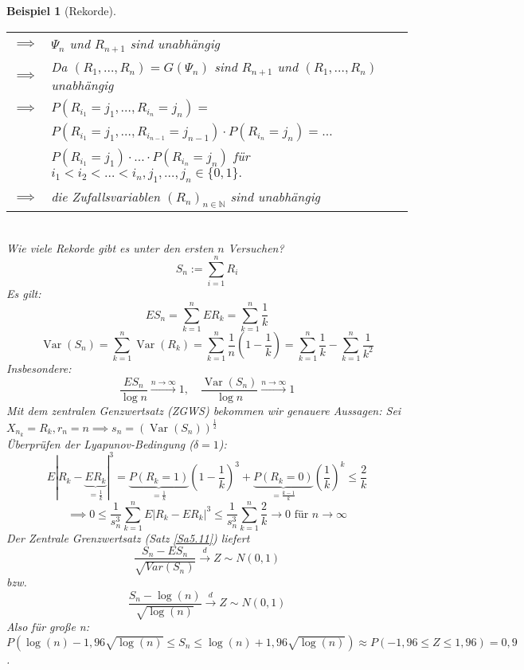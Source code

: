 \documentclass[a4paper,11pt]{book}
\newcommand{\N}{{\mathbb N}}
\DeclareMathOperator{\var}{Var}
\def\folgt{\ensuremath{\implies}}
\def\dto{\stackrel{d}{\rightarrow}}
\newtheorem{Bsp}{Beispiel}[chapter]
\theoremstyle{nonumberplain}
\begin{document}
\begin{Bsp}[Rekorde]
\begin{tabular}[b]{rp{}}
$\folgt$ & $\Psi_n$ und $R_{n+1}$ sind unabhängig\\
$\folgt$ & Da $(R_1, \ldots, R_n) = G(\Psi_n)$ sind $R_{n+1}$ und $(R_1,\ldots,R_n)$ unabhängig\\
$\folgt$& $P(R_{i_1}=j_1,\ldots,R_{i_n}=j_n) =$\\
&$P(R_{i_1}=j_1,\ldots,R_{i_{n-1}}=j_{n-1})\cdot P(R_{i_n}=j_n) = \ldots$\\
&$P(R_{i_1}=j_1)\cdot\ldots\cdot P(R_{i_n} = j_n)$ für $i_1<i_2<\ldots<i_n, j_1,\ldots,j_n\in\{0,1\}.$\\
$\folgt$ & die Zufallsvariablen $(R_n)_{n\in\N}$ sind unabhängig
\end{tabular}\\
Wie viele Rekorde gibt es unter den ersten $n$ Versuchen?
$$S_n:=\sum_{i=1}^n R_i$$
Es gilt:
$$ES_n = \sum_{k=1}^n ER_k = \sum_{k=1}^n \frac 1 k$$
$$\var(S_n) = \sum_{k=1}^n\var(R_k) = \sum_{k=1}^n\frac 1 n (1 - \frac 1 k ) = \sum_{k=1}^n\frac 1 k - \sum_{k=1}^n \frac 1 {k^2}$$
Insbesondere:
$$\frac{ES_n}{\log n}\stackrel{n\to\infty}{\to}1,\quad\frac{\var(S_n)}{\log n}\stackrel{n\to\infty}{\to}1$$
Mit dem zentralen Genzwertsatz (ZGWS) bekommen wir genauere Aussagen: Sei $X_{n_k} = R_k, r_n = n \folgt s_n = \left(\var(S_n)\right)^{\frac 1 2}$\\
Überprüfen der Lyapunov-Bedingung ($\delta = 1$):
$$E|R_k - \underbrace{ER_k}_{= \frac 1 k}|^3 = \underbrace{P(R_k=1)}_{=\frac 1 k}(1-\frac 1 k )^3 + \underbrace{P(R_k = 0)}_{=\frac {k-1} k}\left(\frac 1 k\right)^k\le\frac 2 k$$
$$\folgt 0\le\frac 1 {s_n^3}\sum_{k=1}^n E|R_k-ER_k|^3\le\frac 1 {s_n^3}\sum_{k=1}^n\frac 2 k\to 0 \text{ für } n\to\infty$$
Der Zentrale Grenzwertsatz (Satz \ref{Sa5.11}) liefert $$\frac{S_n - ES_n}{\sqrt{Var (S_n)}} \dto Z\sim N(0,1)$$ bzw. $$\frac{S_n - \log(n)}{\sqrt{\log(n)}} \dto Z\sim N(0,1)$$
Also für große n: $P(\log(n) - 1,96\sqrt{\log(n)} \leq S_n \leq \log(n) + 1,96\sqrt{\log(n)}) \approx P(-1,96 \leq Z \leq 1,96) = 0,9$.
\end{Bsp}
\end{document}
